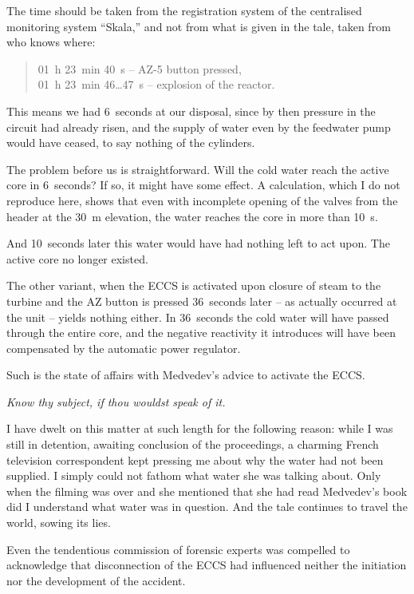 \documentclass[openright]{bookest}
\begin{document}
The time should be taken from the registration system of the centralised monitoring system ``Skala,'' and not from what is given in the tale, taken from who knows where:

\begin{quote}
01~h 23~min 40~s -- AZ-5 button pressed,\\
01~h 23~min 46\ldots47~s -- explosion of the reactor.
\end{quote}

This means we had \num{6}~seconds at our disposal, since by then pressure in the circuit had already risen, and the supply of water even by the feedwater pump would have ceased, to say nothing of the cylinders.

The problem before us is straightforward. Will the cold water reach the active core in \num{6}~seconds? If so, it might have some effect. A calculation, which I do not reproduce here, shows that even with incomplete opening of the valves from the header at the \qty{+30}{\metre} elevation, the water reaches the core in more than \qty{10}{\second}.

And \num{10}~seconds later this water would have had nothing left to act upon. The active core no longer existed.

The other variant, when the ECCS is activated upon closure of steam to the turbine and the AZ button is pressed \num{36}~seconds later -- as actually occurred at the unit -- yields nothing either. In \num{36}~seconds the cold water will have passed through the entire core, and the negative reactivity it introduces will have been compensated by the automatic power regulator.

Such is the state of affairs with Medvedev's advice to activate the ECCS.

\textit{Know thy subject, if thou wouldst speak of it.}

I have dwelt on this matter at such length for the following reason: while I was still in detention, awaiting conclusion of the proceedings, a charming French television correspondent kept pressing me about why the water had not been supplied. I simply could not fathom what water she was talking about. Only when the filming was over and she mentioned that she had read Medvedev's book did I understand what water was in question. And the tale continues to travel the world, sowing its lies.

Even the tendentious commission of forensic experts was compelled to acknowledge that disconnection of the ECCS had influenced neither the initiation nor the development of the accident.
\end{document}
